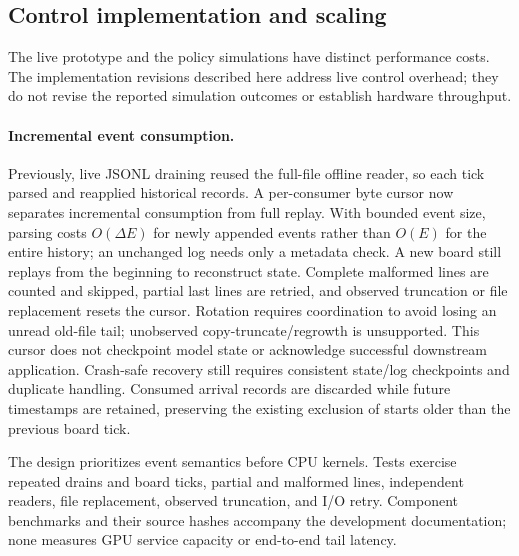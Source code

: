 \subsection{Control implementation and scaling}
\label{sec:control-implementation}
The live prototype and the policy simulations have distinct performance costs.
The implementation revisions described here address live control overhead; they
do not revise the reported simulation outcomes or establish hardware throughput.

\paragraph{Incremental event consumption.}
Previously, live JSONL draining reused the full-file offline reader, so each tick
parsed and reapplied historical records. A per-consumer byte cursor now separates
incremental consumption from full replay. With bounded event size, parsing costs
$O(\Delta E)$ for newly appended events rather than $O(E)$ for the entire history;
an unchanged log needs only a metadata check. A new board still replays from the
beginning to reconstruct state. Complete malformed lines are counted and skipped,
partial last lines are retried, and observed truncation or file replacement resets
the cursor. Rotation requires coordination to avoid losing an unread old-file tail;
unobserved copy-truncate/regrowth is unsupported. This cursor does not checkpoint
model state or acknowledge successful downstream application. Crash-safe recovery
still requires consistent state/log checkpoints and duplicate handling. Consumed
arrival records are discarded while future timestamps are retained, preserving
the existing exclusion of starts older than the previous board tick.

The design prioritizes event semantics before CPU kernels. Tests exercise repeated
drains and board ticks, partial and malformed lines, independent readers, file
replacement, observed truncation, and I/O retry. Component benchmarks and their
source hashes accompany the development documentation; none measures GPU service
capacity or end-to-end tail latency.

